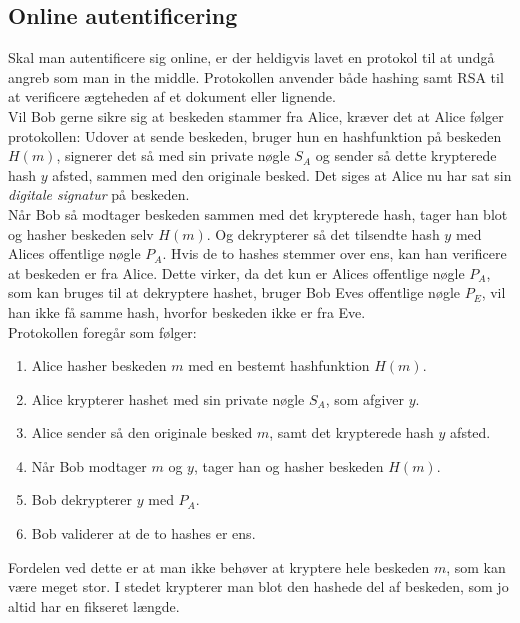     \subsection{Online autentificering}
    Skal man autentificere sig online, er der heldigvis lavet en protokol til at undgå angreb som man in the middle.\cite{dtu}
    Protokollen anvender både hashing samt RSA til at verificere ægteheden af et dokument eller lignende.\\
    Vil Bob gerne sikre sig at beskeden stammer fra Alice, kræver det at Alice følger protokollen:
    Udover at sende beskeden, bruger hun en hashfunktion på beskeden \(H(m)\), signerer det så med sin private nøgle \(S_A\) og sender så dette krypterede hash \(y\) afsted, sammen med den originale besked.
    Det siges at Alice nu har sat sin \emph{digitale signatur} på beskeden.\\
    Når Bob så modtager beskeden sammen med det krypterede hash, tager han blot og hasher beskeden selv \(H(m)\).
    Og dekrypterer så det tilsendte hash \(y\) med Alices offentlige nøgle \(P_A\).
    Hvis de to hashes stemmer over ens, kan han verificere at beskeden er fra Alice.
    Dette virker, da det kun er Alices offentlige nøgle \(P_A\), som kan bruges til at dekryptere hashet, bruger Bob Eves offentlige nøgle \(P_E\), vil han ikke få samme hash, hvorfor beskeden ikke er fra Eve.\\

    Protokollen foregår som følger:
    \begin{enumerate}[noitemsep]
        \item Alice hasher beskeden \(m\) med en bestemt hashfunktion \(H(m)\).
        \item Alice krypterer hashet med sin private nøgle \(S_A\), som afgiver \(y\).
        \item Alice sender så den originale besked \(m\), samt det krypterede hash \(y\) afsted.
        \item Når Bob modtager \(m\) og \(y\), tager han og hasher beskeden \(H(m)\).
        \item Bob dekrypterer \(y\) med \(P_A\).
        \item Bob validerer at de to hashes er ens.
    \end{enumerate}

    Fordelen ved dette er at man ikke behøver at kryptere hele beskeden \(m\), som kan være meget stor. I stedet krypterer man blot den hashede del af beskeden, som jo altid har en fikseret længde.


